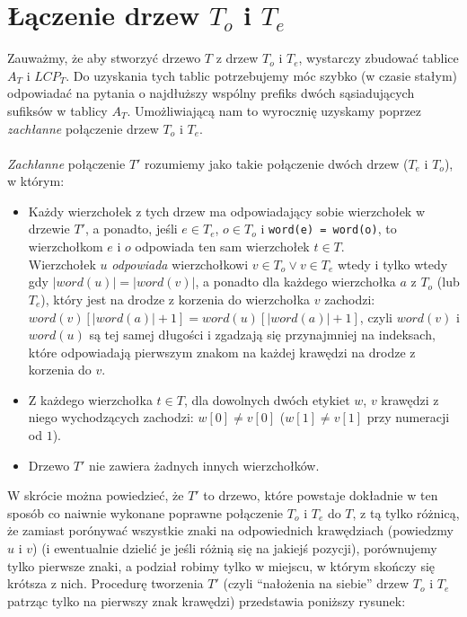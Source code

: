 \documentclass[a4paper,oneside,10pt]{book}
\begin{document}
\section*{Łączenie drzew $T_o$ i $T_e$}
Zauważmy, że aby stworzyć drzewo $T$ z drzew $T_o$ i $T_e$, wystarczy zbudować tablice $A_T$ i $LCP_T$. Do uzyskania tych tablic potrzebujemy móc szybko (w czasie stałym) odpowiadać na pytania o najdłuższy wspólny prefiks dwóch sąsiadujących sufiksów w tablicy $A_T$. Umożliwiającą nam to wyrocznię uzyskamy poprzez \textit{zachłanne} połączenie drzew $T_o$ i $T_e$. \\ \\
\textit{Zachłanne} połączenie $T'$ rozumiemy jako takie połączenie dwóch drzew ($T_e$ i $T_o$), w którym:
\begin{itemize}
 \item Każdy wierzchołek z tych drzew ma odpowiadający sobie wierzchołek w drzewie $T'$, a ponadto, jeśli $e \in T_e$, $o \in T_o$ i \verb|word(e) = word(o)|, to wierzchołkom $e$ i $o$ odpowiada ten sam wierzchołek $t \in T$. \\
 Wierzchołek $u$ \textit{odpowiada} wierzchołkowi $v \in T_o \vee v \in T_e$ wtedy i tylko wtedy gdy $|word(u)| = |word(v)|$, a ponadto dla każdego wierzchołka $a$ z $T_o$ (lub $T_e$), który jest na drodze z korzenia do wierzchołka $v$ zachodzi: $word(v)[|word(a)| + 1] = word(u)[|word(a)| + 1]$, czyli $word(v)$ i $word(u)$ są tej samej długości i zgadzają się przynajmniej na indeksach, które odpowiadają pierwszym znakom na każdej krawędzi na drodze z korzenia do $v$.
 \item Z każdego wierzchołka $t \in T$, dla dowolnych dwóch etykiet $w$, $v$ krawędzi z niego wychodzących zachodzi: $w[0] \ne v[0]$ ($w[1] \ne v[1]$ przy numeracji od $1$).
 \item Drzewo $T'$ nie zawiera żadnych innych wierzchołków.
\end{itemize}
W skrócie można powiedzieć, że $T'$ to drzewo, które powstaje dokładnie w ten sposób co naiwnie wykonane poprawne połączenie $T_o$ i $T_e$ do $T$, z tą tylko różnicą, że zamiast porónywać wszystkie znaki na odpowiednich krawędziach (powiedzmy $u$ i $v$) (i ewentualnie dzielić je jeśli różnią się na jakiejś pozycji), porównujemy tylko pierwsze znaki, a podział robimy tylko w miejscu, w którym skończy się krótsza z nich. Procedurę tworzenia $T'$ (czyli ``nałożenia na siebie'' drzew $T_o$ i $T_e$ patrząc tylko na pierwszy znak krawędzi) przedstawia poniższy rysunek:
\end{document}
